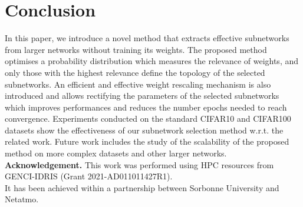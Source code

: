 \section{Conclusion}

In this paper, we introduce a novel method that extracts effective subnetworks
from larger networks without training its weights. The proposed method optimises
a probability distribution which measures the relevance of weights, and only
those with the highest relevance define the topology of the selected
subnetworks. An efficient and effective weight rescaling mechanism is also
introduced and allows rectifying the parameters of the selected subnetworks
which improves performances and reduces the number epochs needed to reach
convergence. Experiments conducted on the standard CIFAR10 and  CIFAR100
datasets show the effectiveness of our subnetwork selection method w.r.t. the
related work. Future work includes the study of the scalability of the proposed
method on more complex datasets and other larger networks.\\

\noindent\textbf{Acknowledgement.} 
This work was performed using HPC resources from GENCI-IDRIS (Grant 2021-AD011011427R1). \\
It has been achieved within a partnership between Sorbonne University and Netatmo.

